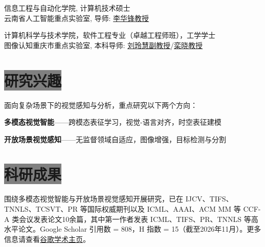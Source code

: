 \documentclass{resume}
\begin{document}
信息工程与自动化学院, 计算机技术硕士\\
云南省人工智能重点实验室, 导师: \href{https://scholar.google.com.hk/citations?user=njjX8D0AAAAJ&hl=zh-CN}{李华锋教授}

计算机科学与技术学院，软件工程专业（卓越工程师班），工学学士\\
图像认知重庆市重点实验室, 本科导师: \href{https://faculty.cqupt.edu.cn/liulh/zh_CN/index.htm}{刘玲慧副教授}/\href{https://faculty.cqupt.edu.cn/luanxiao/zh_CN/index.htm}{栾晓教授}




\section{\colorbox{gray}{\color{white}研究兴趣}}
面向复杂场景下的视觉感知与分析，重点研究以下两个方向：

\textbf{多模态视觉智能}——跨模态表征学习，视觉-语言对齐，时空表征建模

\textbf{开放场景视觉感知}——无监督领域自适应，图像增强，目标检测与分割

\section{\colorbox{gray}{\color{white}科研成果}}
围绕多模态视觉智能与开放场景视觉感知开展研究，已在 IJCV、TIFS、TNNLS、TCSVT、PR 等国际权威期刊以及 ICML、AAAI、ACM MM 等 CCF-A 类会议发表论文10余篇，其中第一作者发表 ICML、TIFS、PR、TNNLS 等高水平论文。Google Scholar 引用数 = 808，H 指数 = 15（截至2026年11月）。更多信息请查看\href{https://scholar.google.com/citations?user=ePe0rG4AAAAJ&hl=zh-CN}{谷歌学术主页}。\\
\end{document}
